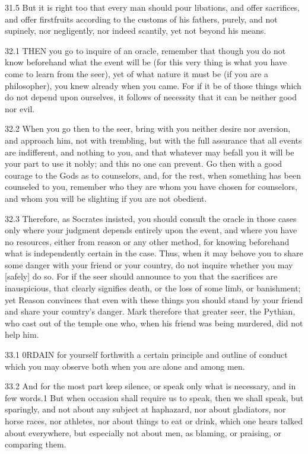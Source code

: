    31.5   But it is right too that every man should pour libations, and offer sacrifices, and offer firstfruits according to the customs of his fathers, purely, and not supinely, nor negligently, nor indeed scantily, yet not beyond his means.

   32.1   THEN you go to inquire of an oracle, remember that though you do not know beforehand what the event will be (for this very thing is what you have come to learn from the seer), yet of what nature it must be (if you are a philosopher), you knew already when you came.  For if it be of those things which do not depend upon ourselves, it follows of necessity that it can be neither good nor evil.

   32.2    When you go then to the seer, bring with you neither desire nor aversion, and approach him, not with trembling, but with the full assurance that all events are indifferent, and nothing to you, and that whatever may befall you it will be your part to use it nobly; and this no one can prevent.  Go then with a good courage to the Gods as to counselors, and, for the rest, when something has been counseled to you, remember who they are whom you have chosen for counselors, and whom you will be slighting if you are not obedient.

   32.3   Therefore, as Socrates insisted, you should consult the oracle in those cases only where your judgment depends entirely upon the event, and where you have no resources, either from reason or any other method, for knowing beforehand what is independently certain in the case. Thus, when it may behove you to share some danger with your friend or your country, do not inquire whether you may [safely] do so. For if the seer should announce to you that the sacrifices are inauspicious, that clearly signifies death, or the loss of some limb, or banishment; yet Reason convinces that even with these things you should stand by your friend and share your country’s danger. Mark therefore that greater seer, the Pythian, who cast out of the temple one who, when his friend was being murdered, did not help him.

   33.1   0RDAIN for yourself forthwith a certain principle and outline of conduct which you may observe both when you are alone and among men.

   33.2   And for the most part keep silence, or speak only what is necessary, and in few words.1 But when occasion shall require us to speak, then we shall speak, but sparingly, and not about any subject at haphazard, nor about gladiators, nor horse races, nor athletes, nor about things to eat or drink, which one hears talked about everywhere, but especially not about men, as blaming, or praising, or comparing them.


